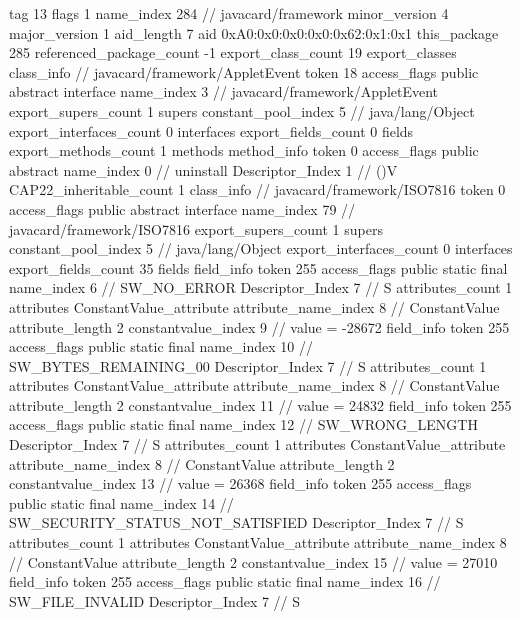 {{{			tag	13
			flags	1
			name_index	284		// javacard/framework
			minor_version	4
			major_version	1
			aid_length	7
			aid	0xA0:0x0:0x0:0x0:0x62:0x1:0x1
		}
	}
	this_package	285
	referenced_package_count	-1
	export_class_count	19
	export_classes {
		class_info {		// javacard/framework/AppletEvent
			token	18
			access_flags	public abstract interface
			name_index	3		// javacard/framework/AppletEvent
			export_supers_count	1
			supers {
				constant_pool_index	5		// java/lang/Object
			}
			export_interfaces_count	0
			interfaces {
			}
			export_fields_count	0
			fields {
			}
			export_methods_count	1
			methods {
				method_info {
					token	0
					access_flags	public abstract
					name_index	0		// uninstall
					Descriptor_Index	1		// ()V
				}
			}
			CAP22_inheritable_count	1
		}
		class_info {		// javacard/framework/ISO7816
			token	0
			access_flags	public abstract interface
			name_index	79		// javacard/framework/ISO7816
			export_supers_count	1
			supers {
				constant_pool_index	5		// java/lang/Object
			}
			export_interfaces_count	0
			interfaces {
			}
			export_fields_count	35
			fields {
			field_info {
				token	255
				access_flags	public static final
				name_index	6		// SW_NO_ERROR
				Descriptor_Index	7		// S
				attributes_count	1
				attributes {
				ConstantValue_attribute {
					attribute_name_index	8		// ConstantValue
					attribute_length	2
					constantvalue_index	9		// value = -28672
				}
				}
			}
			field_info {
				token	255
				access_flags	public static final
				name_index	10		// SW_BYTES_REMAINING_00
				Descriptor_Index	7		// S
				attributes_count	1
				attributes {
				ConstantValue_attribute {
					attribute_name_index	8		// ConstantValue
					attribute_length	2
					constantvalue_index	11		// value = 24832
				}
				}
			}
			field_info {
				token	255
				access_flags	public static final
				name_index	12		// SW_WRONG_LENGTH
				Descriptor_Index	7		// S
				attributes_count	1
				attributes {
				ConstantValue_attribute {
					attribute_name_index	8		// ConstantValue
					attribute_length	2
					constantvalue_index	13		// value = 26368
				}
				}
			}
			field_info {
				token	255
				access_flags	public static final
				name_index	14		// SW_SECURITY_STATUS_NOT_SATISFIED
				Descriptor_Index	7		// S
				attributes_count	1
				attributes {
				ConstantValue_attribute {
					attribute_name_index	8		// ConstantValue
					attribute_length	2
					constantvalue_index	15		// value = 27010
				}
				}
			}
			field_info {
				token	255
				access_flags	public static final
				name_index	16		// SW_FILE_INVALID
				Descriptor_Index	7		// S
}}}}}
